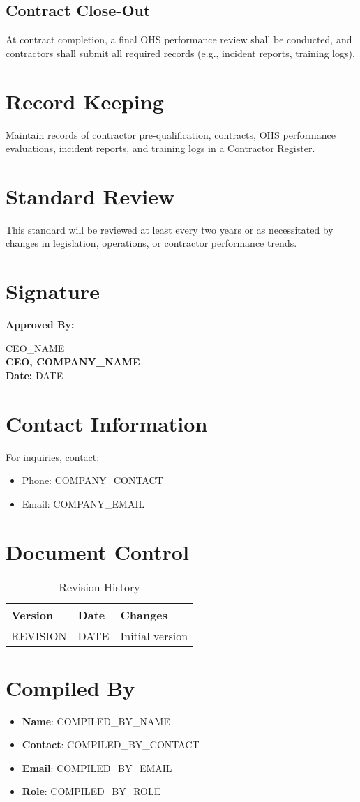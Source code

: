 \documentclass[12pt]{article}
\begin{document}
\subsection{Contract Close-Out}
At contract completion, a final OHS performance review shall be conducted, and contractors shall submit all required records (e.g., incident reports, training logs).

\section{Record Keeping}
Maintain records of contractor pre-qualification, contracts, OHS performance evaluations, incident reports, and training logs in a Contractor Register.

\section{Standard Review}
This standard will be reviewed at least every two years or as necessitated by changes in legislation, operations, or contractor performance trends.

\section{Signature}
\textbf{Approved By:}

{{CEO_NAME}}\\
\textbf{CEO, {{COMPANY_NAME}}}\\
\textbf{Date:} {{DATE}}

\section{Contact Information}
For inquiries, contact:
\begin{itemize}
    \item Phone: {{COMPANY_CONTACT}}
    \item Email: {{COMPANY_EMAIL}}
\end{itemize}

\section{Document Control}
\begin{table}[h]
    \centering
    \begin{tabular}{p{3cm}p{3cm}p{6cm}}
        \toprule
        \textbf{Version} & \textbf{Date} & \textbf{Changes} \\
        \midrule
        {{REVISION}} & {{DATE}} & Initial version \\
        \bottomrule
    \end{tabular}
    \caption{Revision History}
\end{table}

\section{Compiled By}
\begin{itemize}
    \item \textbf{Name}: {{COMPILED_BY_NAME}}
    \item \textbf{Contact}: {{COMPILED_BY_CONTACT}}
    \item \textbf{Email}: {{COMPILED_BY_EMAIL}}
    \item \textbf{Role}: {{COMPILED_BY_ROLE}}
\end{itemize}
\end{document}

